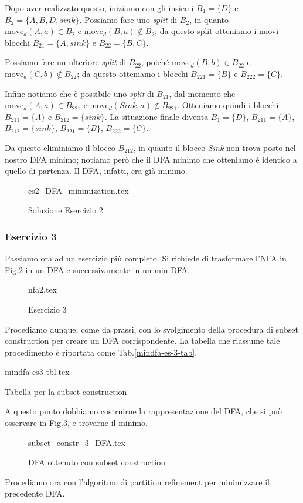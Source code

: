 \documentclass[class=book, crop=false, oneside, 12pt]{standalone}
\begin{document}
Dopo aver realizzato questo, iniziamo con gli insiemi \(B_{1}=\{D\}\) e \(B_{2}=\{A,B,D,sink\}\). Possiamo fare uno \emph{split} di \(B_{2}\), in quanto \(\textrm{move}_{d}(A,a) \in B_{2} \) e \(\textrm{move}_{d}(B,a) \notin B_{2} \); da questo split otteniamo i nuovi blocchi \(B_{21}=\{A,sink\}\) e \(B_{22}=\{B,C\}\).

Possiamo fare un ulteriore \emph{split} di \(B_{22}\), poiché \(\textrm{move}_{d}(B,b) \in B_{22} \) e \(\textrm{move}_{d}(C,b) \notin B_{22} \); da questo otteniamo i blocchi \(B_{221}=\{B\}\) e \(B_{222}=\{C\}\).

Infine notiamo che è possibile uno \emph{split} di \(B_{21}\), dal momento che \(\textrm{move}_{d}(A,a) \in B_{221} \) e \(\textrm{move}_{d}(Sink,a) \notin B_{221} \). Otteniamo quindi i blocchi \(B_{211}=\{A\}\) e \(B_{212}=\{sink\}\).
La situazione finale diventa \(B_{1}=\{D\}\), \(B_{211}=\{A\}\), \(B_{212}=\{sink\}\), \(B_{221}=\{B\}\), \(B_{222}=\{C\}\).

Da questo eliminiamo il blocco \(B_{212}\), in quanto il blocco \emph{Sink} non trova posto nel nostro DFA minimo; notiamo però che il DFA minimo che otteniamo è identico a quello di partenza. Il DFA, infatti, era già minimo.  

\begin{figure}[H]
	\centering
    {es2_DFA_minimization.tex}
	\caption{Soluzione Esercizio 2}
  \label{mindfa-es-2-sol}
\end{figure}

\subsubsection{Esercizio 3}
Passiamo ora ad un esercizio più completo. Si richiede di trasformare l'NFA in Fig.\ref{mindfa-es-3} in un DFA e successivamente in un min DFA.
\begin{figure}[htb]
	\centering
  {nfa2.tex}
	\caption{Esercizio 3}
	\label{mindfa-es-3}
\end{figure}
Procediamo dunque, come da prassi, con lo svolgimento della procedura di subset construction per creare un DFA corrispondente. La tabella che riassume tale procedimento è riportata come Tab.\ref{mindfa-es-3-tab}.
\begin{table}[H]
	\centering
	{mindfa-es3-tbl.tex}
	\caption{Tabella per la subset construction}
	\label{mindfa-es-3-tab}
\end{table}
A questo punto dobbiamo costruirne la rappresentazione del DFA, che si può osservare in Fig.\ref{dfa-sc-es-3-mindfa}, e trovarne il minimo.
\begin{figure}
	\centering
    {subset_constr_3_DFA.tex}
	\caption{DFA ottenuto con subset construction}
	\label{dfa-sc-es-3-mindfa}
\end{figure}
Procediamo ora con l’algoritmo di partition refinement per minimizzare il precedente DFA.
\end{document}
